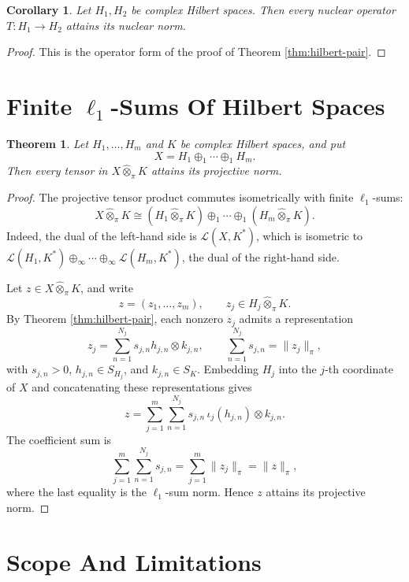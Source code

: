 \documentclass[11pt]{article}
\newtheorem{theorem}{Theorem}
\newtheorem{corollary}{Corollary}
\theoremstyle{remark}
\newcommand{\oplusone}{\oplus_1}
\begin{document}
\begin{corollary}\label{cor:hilbert-nuclear}
Let \(H_1,H_2\) be complex Hilbert spaces.  Then every nuclear operator
\(T:H_1\to H_2\) attains its nuclear norm.
\end{corollary}

\begin{proof}
This is the operator form of the proof of Theorem \ref{thm:hilbert-pair}.
\end{proof}

\section[Finite ell-1 Sums Of Hilbert Spaces]{Finite \(\ell_1\)-Sums Of Hilbert Spaces}

\begin{theorem}\label{thm:l1-sum-hilbert}
Let \(H_1,\ldots,H_m\) and \(K\) be complex Hilbert spaces, and put
\[
  X=H_1\oplusone \cdots \oplusone H_m .
\]
Then every tensor in \(X\widehat\otimes_\pi K\) attains its projective norm.
\end{theorem}

\begin{proof}
The projective tensor product commutes isometrically with finite
\(\ell_1\)-sums:
\[
  X\widehat\otimes_\pi K
  \cong
  (H_1\widehat\otimes_\pi K)\oplusone\cdots\oplusone
  (H_m\widehat\otimes_\pi K).
\]
Indeed, the dual of the left-hand side is
\(\mathcal L(X,K^*)\), which is isometric to
\(\mathcal L(H_1,K^*)\oplus_\infty\cdots\oplus_\infty
\mathcal L(H_m,K^*)\), the dual of the right-hand side.

Let \(z\in X\widehat\otimes_\pi K\), and write
\[
  z=(z_1,\ldots,z_m),\qquad z_j\in H_j\widehat\otimes_\pi K.
\]
By Theorem \ref{thm:hilbert-pair}, each nonzero \(z_j\) admits a representation
\[
  z_j=\sum_{n=1}^{N_j} s_{j,n} h_{j,n}\otimes k_{j,n},
  \qquad
  \sum_{n=1}^{N_j}s_{j,n}=\|z_j\|_\pi,
\]
with \(s_{j,n}>0\), \(h_{j,n}\in S_{H_j}\), and \(k_{j,n}\in S_K\).
Embedding \(H_j\) into the \(j\)-th coordinate of \(X\) and concatenating these
representations gives
\[
  z=\sum_{j=1}^{m}\sum_{n=1}^{N_j}
  s_{j,n}\, \iota_j(h_{j,n})\otimes k_{j,n}.
\]
The coefficient sum is
\[
  \sum_{j=1}^{m}\sum_{n=1}^{N_j}s_{j,n}
  =\sum_{j=1}^{m}\|z_j\|_\pi
  =\|z\|_\pi,
\]
where the last equality is the \(\ell_1\)-sum norm.  Hence \(z\) attains its
projective norm.
\end{proof}

\section{Scope And Limitations}
\end{document}
